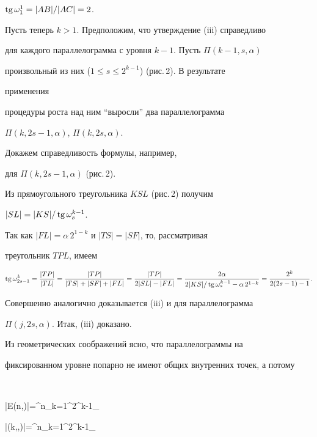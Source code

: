 $\operatorname{tg}\omega^1_1=|AB|/|AC|=2$. 


 


Пусть теперь $k>1$. Предположим, что утверждение (iii) справедливо 


для каждого параллелограмма с уровня $k-1$. Пусть $\Pi(k-1,s,\alpha)$ 


произвольный из них ($1\le s\le 2^{k-1}$) (рис.\,2). В результате 


применения 


процедуры роста над ним ``выросли'' два параллелограмма 


$\Pi(k,2s-1,\alpha)$, $\Pi(k,2s,\alpha)$. 


Докажем справедливость формулы, например, 


для $\Pi(k,2s-1,\alpha)$ (рис.\,2). 


 


Из прямоугольного треугольника $KSL$ (рис.\,2) получим 


$|SL|=|KS|/\operatorname{tg}\omega^{k-1}_s$. 


Так как $|FL|=\alpha\,2^{1-k}$ и $|TS|=|SF|$, то, рассматривая 


треугольник $TPL$, имеем 


$$ 


\tg\omega^k_{2s-1}=\frac{|TP|}{|TL|}= 


\frac{|TP|}{|TS|+|SF|+|FL|}= 


\frac{|TP|}{2|SL|-|FL|}= 


\frac{2\alpha}{2|KS|/\tg\omega^{k-1}_s-\alpha\,2^{1-k}}= 


\frac{2^k}{2(2s-1)-1}. 


$$ 


 


Совершенно аналогично доказывается (iii) и для параллелограмма 


$\Pi(j,2s,\alpha)$. Итак, (iii) доказано. 


 


Из геометрических соображений ясно, что параллелограммы на 


фиксированном уровне попарно не имеют общих внутренних точек, а потому 


$$ 


|E(n,\alpha)|=\sum^n_{k=1}\sum^{2^{k-1}}_{} 


|\Pi(k,\nu,\alpha)|=\sum^n_{k=1}\sum^{2^{k-1}}_{} 


